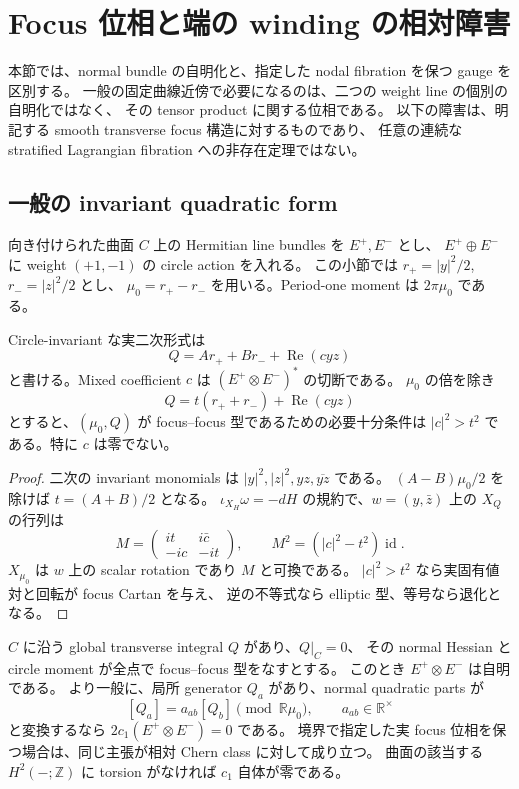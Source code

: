 \section{Focus 位相と端の winding の相対障害}\label{lc:framing}

本節では、normal bundle の自明化と、指定した nodal fibration を保つ gauge を区別する。
一般の固定曲線近傍で必要になるのは、二つの weight line の個別の自明化ではなく、
その tensor product に関する位相である。
以下の障害は、明記する smooth transverse focus 構造に対するものであり、
任意の連続な stratified Lagrangian fibration への非存在定理ではない。

\subsection{一般の invariant quadratic form}

向き付けられた曲面 $C$ 上の Hermitian line bundles を $E^+,E^-$ とし、
$E^+\oplus E^-$ に weight $(+1,-1)$ の circle action を入れる。
この小節では $r_+=|y|^2/2$, $r_-=|z|^2/2$ とし、
$\mu_0=r_+-r_-$ を用いる。Period-one moment は $2\pi\mu_0$ である。

\begin{lemma}\label{lc:framing:hessian}
Circle-invariant な実二次形式は
\[
 Q=A r_++B r_-+\operatorname{Re}(c yz)
\]
と書ける。Mixed coefficient $c$ は $(E^+\otimes E^-)^*$ の切断である。
$\mu_0$ の倍を除き
\[
 Q=t(r_++r_-)+\operatorname{Re}(c yz)
\]
とすると、$(\mu_0,Q)$ が focus--focus 型であるための必要十分条件は
$|c|^2>t^2$ である。特に $c$ は零でない。
\end{lemma}

\begin{proof}
二次の invariant monomials は $|y|^2,|z|^2,yz,\overline{yz}$ である。
$(A-B)\mu_0/2$ を除けば $t=(A+B)/2$ となる。
$\iota_{X_H}\omega=-dH$ の規約で、$w=(y,\bar z)$ 上の $X_Q$ の行列は
\[
 M=\begin{pmatrix}it&i\bar c\\-ic&-it\end{pmatrix},
 \qquad M^2=(|c|^2-t^2)\operatorname{id}.
\]
$X_{\mu_0}$ は $w$ 上の scalar rotation であり $M$ と可換である。
$|c|^2>t^2$ なら実固有値対と回転が focus Cartan を与え、
逆の不等式なら elliptic 型、等号なら退化となる。
\end{proof}

\begin{proposition}\label{lc:framing:chern}
$C$ に沿う global transverse integral $Q$ があり、$Q|_C=0$、
その normal Hessian と circle moment が全点で focus--focus 型をなすとする。
このとき $E^+\otimes E^-$ は自明である。
より一般に、局所 generator $Q_a$ があり、normal quadratic parts が
\[
 [Q_a]=a_{ab}[Q_b]\pmod{\mathbb R\mu_0},\qquad a_{ab}\in\mathbb R^\times
\]
と変換するなら $2c_1(E^+\otimes E^-)=0$ である。
境界で指定した実 focus 位相を保つ場合は、同じ主張が相対 Chern class に対して成り立つ。
曲面の該当する $H^2(-;\mathbb Z)$ に torsion がなければ $c_1$ 自体が零である。
\end{proposition}

